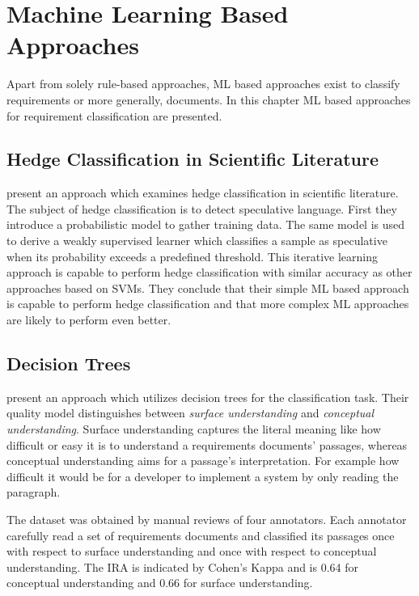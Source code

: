 \section{Machine Learning Based Approaches}
\label{chp:related_research:sec:machine_learingn_based_approaches}

Apart from solely rule-based approaches, \ac{ML} based approaches exist to classify requirements or more generally, documents.
In this chapter \ac{ML} based approaches for requirement classification are presented.

\subsection{Hedge Classification in Scientific Literature}
\textcite{Medlock:2007} present an approach which examines hedge classification in scientific literature.
The subject of hedge classification is to detect speculative language.
First they introduce a probabilistic model to gather training data.
The same model is used to derive a weakly supervised learner which classifies a sample as speculative when its probability exceeds a predefined threshold.
This iterative learning approach is capable to perform hedge classification with similar accuracy as other approaches based on \acp{SVM}.
They conclude that their simple \ac{ML} based approach is capable to perform hedge classification and that more complex \ac{ML} approaches are likely to perform even better.

\subsection{Decision Trees}
\textcite{Ormandjieva:2007} present an approach which utilizes decision trees for the classification task.
Their quality model distinguishes between \textit{surface understanding} and \textit{conceptual understanding}.
Surface understanding captures the literal meaning like how difficult or easy it is to understand a requirements documents' passages, whereas conceptual understanding aims for a passage's interpretation.
For example how difficult it would be for a developer to implement a system by only reading the paragraph.

The dataset was obtained by manual reviews of four annotators.
Each annotator carefully read a set of requirements documents and classified its passages once with respect to surface understanding and once with respect to conceptual understanding.
The \ac{IRA} is indicated by Cohen's Kappa \parencite{Cohen:1960} and is 0.64 for conceptual understanding and 0.66 for surface understanding.

